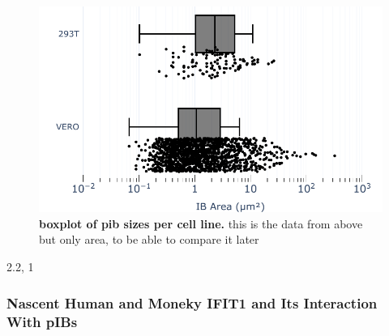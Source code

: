 \begin{figure}
    \centering
    \includegraphics[width=0.75\linewidth]{08. Chapter 3/Figs/03. pIB/01. pIB characterisation/03. box-pib.pdf}
    \caption[boxplot of pib sizes per cell line.]{\textbf{boxplot of pib sizes per cell line.} this is the data from above but only area, to be able to compare it later}
    \label{fig:boxplot of pib sizes per cell line}
\end{figure}

2.2, 1 


\subsubsection{Nascent Human and Moneky IFIT1 and Its Interaction With pIBs}

